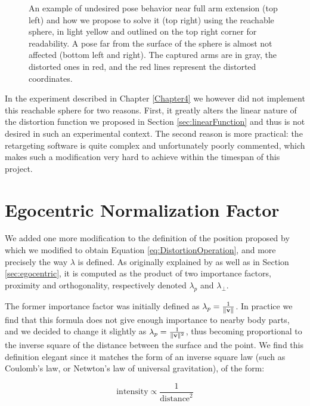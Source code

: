 \begin{figure}[h]
    \caption{An example of undesired pose behavior near full arm extension (top left) and how we propose to solve it (top right) using the reachable sphere, in light yellow and outlined on the top right corner for readability. A pose far from the surface of the sphere is almost not affected (bottom left and right). The captured arms are in gray, the distorted ones in red, and the red lines represent the distorted coordinates.}
    \label{fig:reachableSphere}
\end{figure}

In the experiment described in Chapter \ref{Chapter4} we however did not implement this reachable sphere for two reasons. First, it greatly alters the linear nature of the distortion function we proposed in Section \ref{sec:linearFunction} and thus is not desired in such an experimental context. The second reason is more practical: the retargeting software is quite complex and unfortunately poorly commented, which makes such a modification very hard to achieve within the timespan of this project.

\section{Egocentric Normalization Factor}

We added one more modification to the definition of the position proposed by \cite{molla2017egocentric} which we modified to obtain Equation \ref{eq:DistortionOperation}, and more precisely the way $\lambda $ is defined. As originally explained by \cite{molla2016precise} as well as in Section \ref{sec:egocentric}, it is computed as the product of two importance factors, proximity and orthogonality, respectively denoted $\lambda_p$ and $\lambda_\perp $.

The former importance factor was initially defined as $\lambda_p = \frac{1}{\lVert\mathbf{v}\rVert}$. In practice we find that this formula does not give enough importance to nearby body parts, and we decided to change it slightly as $\lambda_p = \frac{1}{\lVert\mathbf{v}\rVert^2}$, thus becoming proportional to the inverse square of the distance between the surface and the point. We find this definition elegant since it matches the form of an inverse square law (such as Coulomb's law, or Netwton's law of universal gravitation), of the form:

\begin{equation*}
    \text{intensity} \propto \frac{1}{\text{distance}^2}
\end{equation*}

